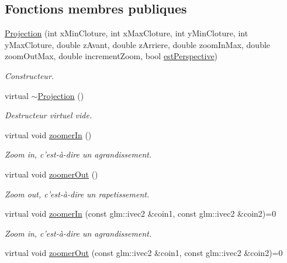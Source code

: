 \subsection*{Fonctions membres publiques}
\begin{DoxyCompactItemize}
\item 
\hyperlink{classvue_1_1_projection_a27549dbc8ece7f5fdb3f7cd5d7a66fad}{Projection} (int x\-Min\-Cloture, int x\-Max\-Cloture, int y\-Min\-Cloture, int y\-Max\-Cloture, double z\-Avant, double z\-Arriere, double zoom\-In\-Max, double zoom\-Out\-Max, double increment\-Zoom, bool \hyperlink{classvue_1_1_projection_a3d9b70124ec0b3ed22299158abc4067c}{est\-Perspective})
\begin{DoxyCompactList}\small\item\em Constructeur. \end{DoxyCompactList}\item 
\hypertarget{classvue_1_1_projection_acb6551eb343f0b522c4994022a85b570}{virtual \hyperlink{classvue_1_1_projection_acb6551eb343f0b522c4994022a85b570}{$\sim$\-Projection} ()}\label{classvue_1_1_projection_acb6551eb343f0b522c4994022a85b570}

\begin{DoxyCompactList}\small\item\em Destructeur virtuel vide. \end{DoxyCompactList}\item 
virtual void \hyperlink{classvue_1_1_projection_afd26ae5ad3c21d00668d8d571e517835}{zoomer\-In} ()
\begin{DoxyCompactList}\small\item\em Zoom in, c'est-\/à-\/dire un agrandissement. \end{DoxyCompactList}\item 
virtual void \hyperlink{classvue_1_1_projection_a7726497f78c6b9e22bee96187755aa79}{zoomer\-Out} ()
\begin{DoxyCompactList}\small\item\em Zoom out, c'est-\/à-\/dire un rapetissement. \end{DoxyCompactList}\item 
\hypertarget{classvue_1_1_projection_af6b1f66bfaa027815d9e7e7e6821ee8b}{virtual void \hyperlink{classvue_1_1_projection_af6b1f66bfaa027815d9e7e7e6821ee8b}{zoomer\-In} (const glm\-::ivec2 \&coin1, const glm\-::ivec2 \&coin2)=0}\label{classvue_1_1_projection_af6b1f66bfaa027815d9e7e7e6821ee8b}

\begin{DoxyCompactList}\small\item\em Zoom in, c'est-\/à-\/dire un agrandissement. \end{DoxyCompactList}\item 
\hypertarget{classvue_1_1_projection_ae96d44a2ab4199dead6401c9e3d56687}{virtual void \hyperlink{classvue_1_1_projection_ae96d44a2ab4199dead6401c9e3d56687}{zoomer\-Out} (const glm\-::ivec2 \&coin1, const glm\-::ivec2 \&coin2)=0}\label{classvue_1_1_projection_ae96d44a2ab4199dead6401c9e3d56687}


\end{DoxyCompactItemize}
